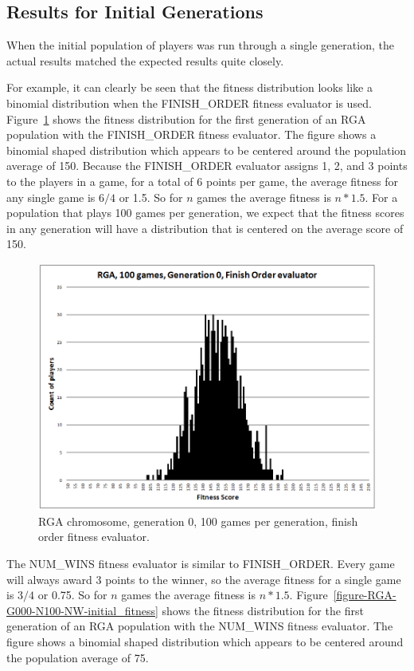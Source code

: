 \subsection{Results for Initial Generations}

When the initial population of players was run through a single generation, the
actual results matched the expected results quite closely. 

For example, it can clearly be seen that the fitness distribution looks like a
binomial distribution when the FINISH\_ORDER fitness evaluator is used.
Figure~\ref{figure-RGA-G000-N100-FO-initial_fitness} shows the fitness
distribution for the first generation of an RGA population with the
FINISH\_ORDER fitness evaluator. The figure shows a binomial shaped distribution
which appears to be centered around the population average of 150. Because the
FINISH\_ORDER evaluator assigns 1, 2, and 3 points to the players in a game, for
a total of 6 points per game, the average fitness for any single game is \(6/4\)
or 1.5. So for \(n\) games the average fitness is \(n * 1.5\).
For a population that plays 100 games per generation, we expect that the fitness
scores in any generation will have a distribution that is centered on the
average score of 150.

\begin{figure}[htbp]
\centerline{\includegraphics[width=0.75\columnwidth]{Figures/RGA_1024_G000_N100_FO.png}}
\caption[RGA Fitness Distribution, Initial Generation]{RGA chromosome,
generation 0, 100 games per generation, finish order fitness evaluator.}
\label{figure-RGA-G000-N100-FO-initial_fitness}
\end{figure}

The NUM\_WINS fitness evaluator is similar to FINISH\_ORDER. Every game will
always award 3 points to the winner, so the average fitness for a single game is
\(3/4\) or 0.75. So for \(n\) games the average fitness is \(n * 1.5\).
Figure~\ref{figure-RGA-G000-N100-NW-initial_fitness} shows the fitness
distribution for the first generation of an RGA population with the
NUM\_WINS fitness evaluator. The figure shows a binomial shaped distribution
which appears to be centered around the population average of 75.

